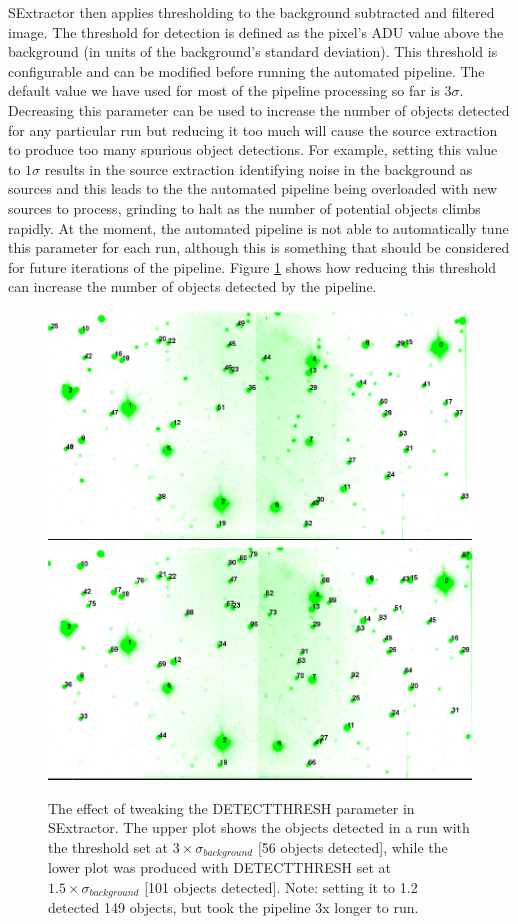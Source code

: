 SExtractor then applies thresholding to the background subtracted and filtered image. The threshold for detection is defined as the pixel's ADU value above the background (in units of the background's standard deviation). This threshold is configurable and can be modified before running the automated pipeline. The default value we have used for most of the pipeline processing so far is $3\sigma$. Decreasing this parameter can be used to increase the number of objects detected for any particular run but reducing it too much will cause the source extraction to produce too many spurious object detections. For example, setting this value to $1\sigma$ results in the source extraction identifying noise in the background as sources and this leads to the the automated pipeline being overloaded with new sources to process, grinding to halt as the number of potential objects climbs rapidly. At the moment, the automated pipeline is not able to automatically tune this parameter for each run, although this is something that should be considered for future iterations of the pipeline. Figure \ref{fig:tweakingthreshold} shows how reducing this threshold can increase the number of objects detected by the pipeline.

\begin{figure}
  \centering
  \includegraphics[width=.8\linewidth]{images/2012-09-03_g_default.png}
  \includegraphics[width=.8\linewidth]{images/2012-09-03_g_15sigma.png}
  \caption{The effect of tweaking the DETECT\textunderscore THRESH parameter in SExtractor. The upper plot shows the objects detected in a run with the threshold set at $ 3\times \sigma_{background}$ [56 objects detected], while the lower plot was produced with DETECT\textunderscore THRESH set at $ 1.5\times \sigma_{background}$  [101 objects detected]. Note: setting it to 1.2 detected 149 objects, but took the pipeline 3x longer to run. }
\label{fig:tweakingthreshold}
\end{figure}

